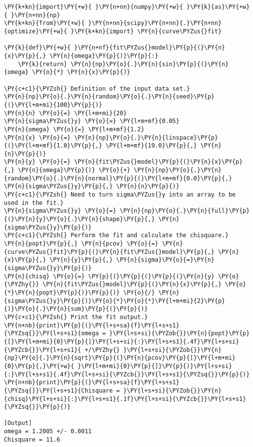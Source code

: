 \begin{Verbatim}[label=\makebox{\href{https://github.com/unipi-physics-labs/statnotes/tree/main/snippy/fit_sin.py}{https://github.com/.../fit\_sin.py}},commandchars=\\\{\}]
\PY{k+kn}{import}\PY{+w}{ }\PY{n+nn}{numpy}\PY{+w}{ }\PY{k}{as}\PY{+w}{ }\PY{n+nn}{np}
\PY{k+kn}{from}\PY{+w}{ }\PY{n+nn}{scipy}\PY{n+nn}{.}\PY{n+nn}{optimize}\PY{+w}{ }\PY{k+kn}{import} \PY{n}{curve\PYZus{}fit}

\PY{k}{def}\PY{+w}{ }\PY{n+nf}{fit\PYZus{}model}\PY{p}{(}\PY{n}{x}\PY{p}{,} \PY{n}{omega}\PY{p}{)}\PY{p}{:}
    \PY{k}{return} \PY{n}{np}\PY{o}{.}\PY{n}{sin}\PY{p}{(}\PY{n}{omega} \PY{o}{*} \PY{n}{x}\PY{p}{)}

\PY{c+c1}{\PYZsh{} Definition of the input data set.}
\PY{n}{np}\PY{o}{.}\PY{n}{random}\PY{o}{.}\PY{n}{seed}\PY{p}{(}\PY{l+m+mi}{100}\PY{p}{)}
\PY{n}{n} \PY{o}{=} \PY{l+m+mi}{20}
\PY{n}{sigma\PYZus{}y} \PY{o}{=} \PY{l+m+mf}{0.05}
\PY{n}{omega} \PY{o}{=} \PY{l+m+mf}{1.2}
\PY{n}{x} \PY{o}{=} \PY{n}{np}\PY{o}{.}\PY{n}{linspace}\PY{p}{(}\PY{l+m+mf}{1.0}\PY{p}{,} \PY{l+m+mf}{19.0}\PY{p}{,} \PY{n}{n}\PY{p}{)}
\PY{n}{y} \PY{o}{=} \PY{n}{fit\PYZus{}model}\PY{p}{(}\PY{n}{x}\PY{p}{,} \PY{n}{omega}\PY{p}{)} \PY{o}{+} \PY{n}{np}\PY{o}{.}\PY{n}{random}\PY{o}{.}\PY{n}{normal}\PY{p}{(}\PY{l+m+mf}{0.0}\PY{p}{,} \PY{n}{sigma\PYZus{}y}\PY{p}{,} \PY{n}{n}\PY{p}{)}
\PY{c+c1}{\PYZsh{} Need to turn sigma\PYZus{}y into an array to be used in the fit.}
\PY{n}{sigma\PYZus{}y} \PY{o}{=} \PY{n}{np}\PY{o}{.}\PY{n}{full}\PY{p}{(}\PY{n}{y}\PY{o}{.}\PY{n}{shape}\PY{p}{,} \PY{n}{sigma\PYZus{}y}\PY{p}{)}
\PY{c+c1}{\PYZsh{} Perform the fit and calculate the chisquare.}
\PY{n}{popt}\PY{p}{,} \PY{n}{pcov} \PY{o}{=} \PY{n}{curve\PYZus{}fit}\PY{p}{(}\PY{n}{fit\PYZus{}model}\PY{p}{,} \PY{n}{x}\PY{p}{,} \PY{n}{y}\PY{p}{,} \PY{n}{sigma}\PY{o}{=}\PY{n}{sigma\PYZus{}y}\PY{p}{)}
\PY{n}{chisq} \PY{o}{=} \PY{p}{(}\PY{p}{(}\PY{p}{(}\PY{n}{y} \PY{o}{\PYZhy{}} \PY{n}{fit\PYZus{}model}\PY{p}{(}\PY{n}{x}\PY{p}{,} \PY{o}{*}\PY{n}{popt}\PY{p}{)}\PY{p}{)} \PY{o}{/} \PY{n}{sigma\PYZus{}y}\PY{p}{)}\PY{o}{*}\PY{o}{*}\PY{l+m+mi}{2}\PY{p}{)}\PY{o}{.}\PY{n}{sum}\PY{p}{(}\PY{p}{)}
\PY{c+c1}{\PYZsh{} Print the fit output.}
\PY{n+nb}{print}\PY{p}{(}\PY{l+s+sa}{f}\PY{l+s+s1}{\PYZsq{}}\PY{l+s+s1}{omega = }\PY{l+s+si}{\PYZob{}}\PY{n}{popt}\PY{p}{[}\PY{l+m+mi}{0}\PY{p}{]}\PY{l+s+si}{:}\PY{l+s+s1}{.4f}\PY{l+s+si}{\PYZcb{}}\PY{l+s+s1}{ +/\PYZhy{} }\PY{l+s+si}{\PYZob{}}\PY{n}{np}\PY{o}{.}\PY{n}{sqrt}\PY{p}{(}\PY{n}{pcov}\PY{p}{[}\PY{l+m+mi}{0}\PY{p}{,}\PY{+w}{ }\PY{l+m+mi}{0}\PY{p}{]}\PY{p}{)}\PY{l+s+si}{:}\PY{l+s+s1}{.4f}\PY{l+s+si}{\PYZcb{}}\PY{l+s+s1}{\PYZsq{}}\PY{p}{)}
\PY{n+nb}{print}\PY{p}{(}\PY{l+s+sa}{f}\PY{l+s+s1}{\PYZsq{}}\PY{l+s+s1}{Chisquare = }\PY{l+s+si}{\PYZob{}}\PY{n}{chisq}\PY{l+s+si}{:}\PY{l+s+s1}{.1f}\PY{l+s+si}{\PYZcb{}}\PY{l+s+s1}{\PYZsq{}}\PY{p}{)}

[Output]
omega = 1.2005 +/- 0.0011
Chisquare = 11.6
\end{Verbatim}

